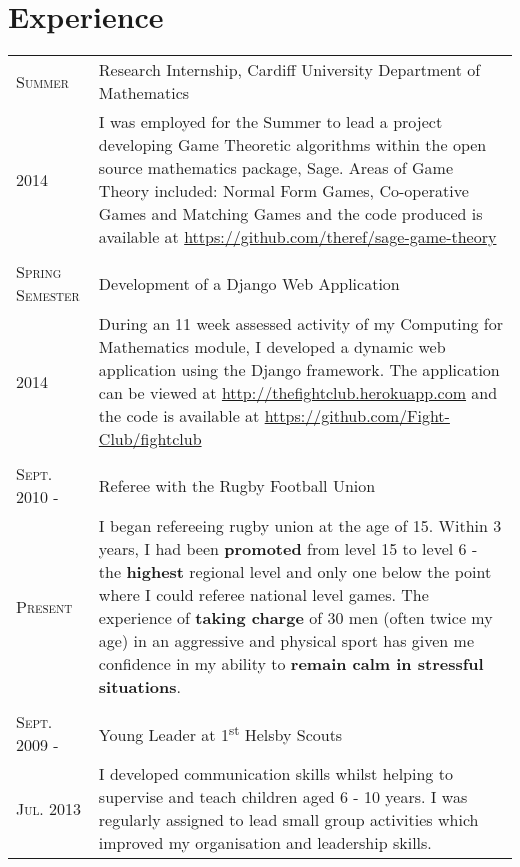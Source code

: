 \documentclass[a4paper]{article}
\begin{document}
\section{Experience}
\begin{tabularx}{\textwidth}{lX}

\textsc{Summer} & Research Internship, Cardiff University Department of Mathematics \\
\textsc{2014}& \footnotesize{I was employed for the Summer to lead a project developing Game Theoretic algorithms within the open source mathematics package, Sage. Areas of Game Theory included: Normal Form Games, Co-operative Games and Matching Games and the code produced is available at \url{https://github.com/theref/sage-game-theory}} \\
\\

\textsc{Spring Semester} & Development of a Django Web Application\\
\textsc{2014}& \footnotesize{During an 11 week assessed activity of my Computing for Mathematics module, I developed a dynamic web application using the Django framework. The application can be viewed at \url{http://thefightclub.herokuapp.com} and the code is available at \url{https://github.com/Fight-Club/fightclub}} \\
\\
\textsc{Sept. 2010 -} & Referee with the Rugby Football Union \\
\textsc{Present} & \footnotesize{I began refereeing rugby union at the age of 15. Within 3 years, I had been \textbf{promoted} from level 15 to level 6 - the \textbf{highest} regional level and only one below the point where I could referee national level games.
The experience of \textbf{taking charge} of 30 men (often twice my age) in an aggressive and physical sport has given me confidence in my ability to \textbf{remain calm in stressful situations}.}\\
\\
\textsc{Sept. 2009 -} & Young Leader at 1\textsuperscript{st} Helsby Scouts\\
\textsc{Jul. 2013}& \footnotesize{I developed communication skills whilst helping to supervise and teach children aged 6 - 10 years.
I was regularly assigned to lead small group activities which improved my organisation and leadership skills.}\\

\end{tabularx}
\end{document}
